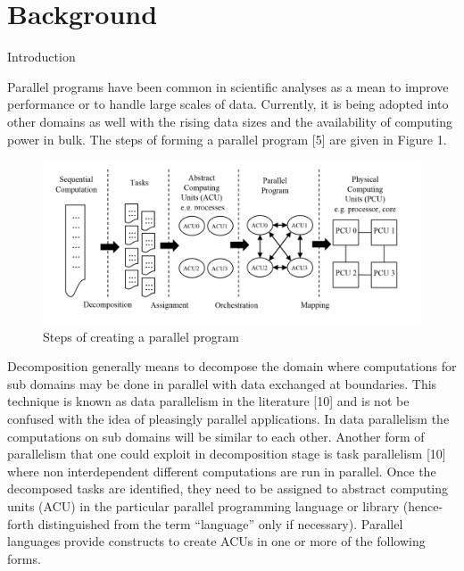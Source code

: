 \chapter{Background}
\label{ch:background}
Introduction

Parallel programs have been common in scientific analyses as a mean to improve performance or to handle large scales of data. Currently, it is being adopted into other domains as well with the rising data sizes and the availability of computing power in bulk. The steps of forming a parallel program [5] are given in Figure 1.
 
\begin{figure}
\centering
\includegraphics[width=0.9\columnwidth]{figures/fig_parallel_decompose}
\caption{Steps of creating a parallel program}
\label{fig:fig_parallel_decompose}
\end{figure}

Decomposition generally means to decompose the domain where computations for sub domains may be done in parallel with data exchanged at boundaries. This technique is known as data parallelism in the literature [10]  and is not be confused with the idea of pleasingly parallel applications. In data parallelism the computations on sub domains will be similar to each other. Another form of parallelism that one could exploit in decomposition stage is task parallelism [10] where non interdependent different computations are run in parallel. 
Once the decomposed tasks are identified, they need to be assigned to abstract computing units (ACU) in the particular parallel programming language or library (hence-forth distinguished from the term “language” only if necessary). Parallel languages provide constructs to create ACUs in one or more of the following forms.

